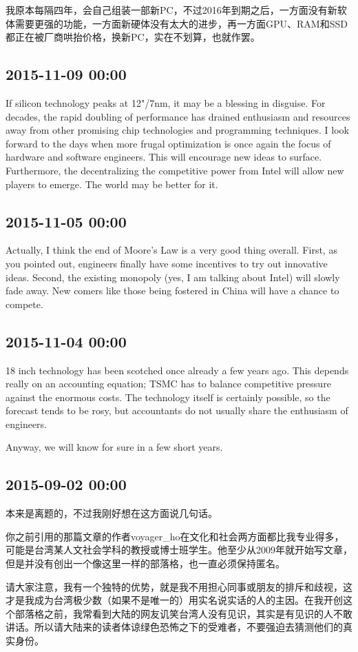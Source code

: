 \documentclass[twocolumn]{ctexart}
\begin{document}
我原本每隔四年，会自己组装一部新PC，不过2016年到期之后，一方面没有新软体需要更强的功能，一方面新硬体没有太大的进步，再一方面GPU、RAM和SSD都正在被厂商哄抬价格，换新PC，实在不划算，也就作罢。\subsection*{2015-11-09 00:00}
If silicon technology peaks at 12"/7nm, it may be a blessing in disguise. For decades, the rapid doubling of performance has drained enthusiasm and resources away from other promising chip technologies and programming techniques. I look forward to the days when more frugal optimization is once again the focus of hardware and software engineers. This will encourage new ideas to surface. Furthermore, the decentralizing the competitive power from Intel will allow new players to emerge. The world may be better for it.\subsection*{2015-11-05 00:00}
Actually, I think the end of Moore's Law is a very good thing overall. First, as you pointed out, engineers finally have some incentives to try out innovative ideas. Second, the existing monopoly (yes, I am talking about Intel) will slowly fade away. New comers like those being fostered in China will have a chance to compete.\subsection*{2015-11-04 00:00}
18 inch technology has been scotched once already a few years ago. This depends really on an accounting equation; TSMC has to balance competitive pressure against the enormous costs. The technology itself is certainly possible, so the forecast tends to be rosy, but accountants do not usually share the enthusiasm of engineers.

Anyway, we will know for sure in a few short years.\subsection*{2015-09-02 00:00}
本来是离题的，不过我刚好想在这方面说几句话。

你之前引用的那篇文章的作者voyager\_ho在文化和社会两方面都比我专业得多，可能是台湾某人文社会学科的教授或博士班学生。他至少从2009年就开始写文章，但是并没有创出一个像这里一样的部落格，也一直必须保持匿名。

请大家注意，我有一个独特的优势，就是我不用担心同事或朋友的排斥和歧视，这才是我成为台湾极少数（如果不是唯一的）用实名说实话的人的主因。在我开创这个部落格之前，我常看到大陆的网友讥笑台湾人没有见识，其实是有见识的人不敢讲话。所以请大陆来的读者体谅绿色恐怖之下的受难者，不要强迫去猜测他们的真实身份。
\end{document}
